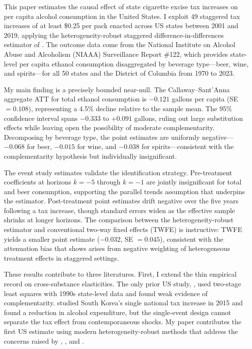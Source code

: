 \documentclass[12pt]{article}
\begin{document}
This paper estimates the causal effect of state cigarette excise tax increases on per capita alcohol consumption in the United States. I exploit 49 staggered tax increases of at least \$0.25 per pack enacted across US states between 2001 and 2019, applying the heterogeneity-robust staggered difference-in-differences estimator of \citet{callaway2021difference}. The outcome data come from the National Institute on Alcohol Abuse and Alcoholism (NIAAA) Surveillance Report \#122, which provides state-level per capita ethanol consumption disaggregated by beverage type---beer, wine, and spirits---for all 50 states and the District of Columbia from 1970 to 2023.

My main finding is a precisely bounded near-null. The Callaway--Sant'Anna aggregate ATT for total ethanol consumption is $-0.121$ gallons per capita (SE $= 0.108$), representing a 4.5\% decline relative to the sample mean. The 95\% confidence interval spans $-0.333$ to $+0.091$ gallons, ruling out large substitution effects while leaving open the possibility of moderate complementarity. Decomposing by beverage type, the point estimates are uniformly negative---$-0.068$ for beer, $-0.015$ for wine, and $-0.038$ for spirits---consistent with the complementarity hypothesis but individually insignificant.

The event study estimates validate the identification strategy. Pre-treatment coefficients at horizons $k = -5$ through $k = -1$ are jointly insignificant for total and beer consumption, supporting the parallel trends assumption that underpins the \citet{callaway2021difference} estimator. Post-treatment point estimates drift negative over the five years following a tax increase, though standard errors widen as the effective sample shrinks at longer horizons. The comparison between the heterogeneity-robust estimator and conventional two-way fixed effects (TWFE) is instructive: TWFE yields a smaller point estimate ($-0.032$, SE $= 0.045$), consistent with the attenuation bias that \citet{goodman2021difference} shows arises from negative weighting of heterogeneous treatment effects in staggered settings.

These results contribute to three literatures. First, I extend the thin empirical record on cross-substance elasticities. The only prior US study, \citet{decker2000cigarettes}, used two-stage least squares with 1990s state-level data and found weak evidence of complementarity. \citet{yu2023cigarette} studied South Korea's single national tax increase in 2015 and found a reduction in alcohol expenditure, but the single-event design cannot separate the tax effect from contemporaneous shocks. My paper contributes the first US estimate using modern heterogeneity-robust methods that address the concerns raised by \citet{goodman2021difference}, \citet{sun2021estimating}, and \citet{roth2023s}.
\end{document}

